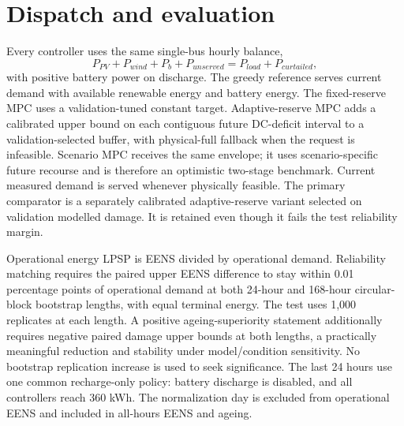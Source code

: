 \documentclass[journal]{IEEEtran}
\begin{document}
\section{Dispatch and evaluation}
Every controller uses the same single-bus hourly balance,
\begin{equation}
P_{PV}+P_{wind}+P_b+P_{unserved}=P_{load}+P_{curtailed},
\end{equation}
with positive battery power on discharge. The greedy reference serves current demand with available renewable energy and battery energy. The fixed-reserve MPC uses a validation-tuned constant target. Adaptive-reserve MPC adds a calibrated upper bound on each contiguous future DC-deficit interval to a validation-selected buffer, with physical-full fallback when the request is infeasible. Scenario MPC receives the same envelope; it uses scenario-specific future recourse and is therefore an optimistic two-stage benchmark. Current measured demand is served whenever physically feasible. The primary comparator is a separately calibrated adaptive-reserve variant selected on validation modelled damage. It is retained even though it fails the test reliability margin.

Operational energy LPSP is EENS divided by operational demand. Reliability matching requires the paired upper EENS difference to stay within 0.01 percentage points of operational demand at both 24-hour and 168-hour circular-block bootstrap lengths, with equal terminal energy. The test uses 1,000 replicates at each length. A positive ageing-superiority statement additionally requires negative paired damage upper bounds at both lengths, a practically meaningful reduction and stability under model/condition sensitivity. No bootstrap replication increase is used to seek significance. The last 24 hours use one common recharge-only policy: battery discharge is disabled, and all controllers reach 360 kWh. The normalization day is excluded from operational EENS and included in all-hours EENS and ageing.
\end{document}
